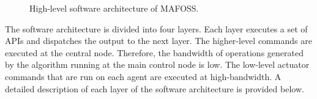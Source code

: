 \begin{figure}
  \caption{High-level software architecture of MAFOSS.}
  \label{fig:MafossSoftwareArchitecture}
\end{figure}
%
The software architecture is divided into four layers. Each layer executes a set of APIs and dispatches the output to the next layer. The higher-level commands are executed at the central node. Therefore, the bandwidth of operations generated by the algorithm running at the main control node is low. The low-level actuator commands that are run on each agent are executed at high-bandwidth. A detailed description of each layer of the software architecture is provided below. %
%

